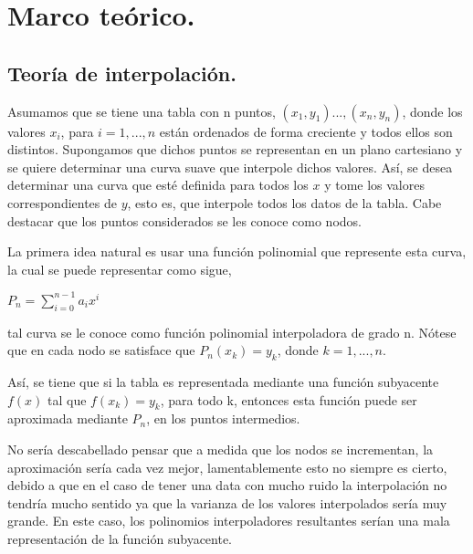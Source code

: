 \chapter{Marco te\'orico.}

\section{Teor\'ia de interpolaci\'on.}


\hspace{0.4cm}Asumamos que se tiene una tabla con n puntos, $(x_{1},y_{1})...,(x_{n},y_{n})$, donde los valores $x_{i}$, para $i=1,...,n$ est\'an ordenados de forma creciente y todos ellos son distintos. Supongamos que dichos puntos se representan en un plano cartesiano y se quiere determinar una curva suave que interpole dichos valores. As\'i, se desea determinar una curva que est\'e definida para todos los $x$ y tome los valores correspondientes de $y$, esto es, que interpole todos los datos de la tabla. Cabe destacar que los puntos considerados se les conoce como nodos.


\vspace{0.5cm}

\hspace{0.4cm} La primera idea natural es usar una funci\'on polinomial que represente esta curva, la cual se puede representar como sigue,

\vspace{0.5cm}
\begin{center}

$\displaystyle{P_{n} = \sum_{i=0}^{n-1} a_{i}x^{i}}$

\end{center}

\noindent tal curva se le conoce como funci\'on polinomial interpoladora de grado n. N\'otese que en cada nodo se satisface que $P_{n}(x_{k})=y_{k}$, donde $k=1,...,n$.

\vspace{0.5cm}

\hspace{0.4cm} As\'i, se tiene que si la tabla es representada mediante una funci\'on subyacente $f(x)$ tal que $f(x_{k})=y_{k}$, para todo k, entonces esta funci\'on puede ser aproximada mediante $P_{n}$, en los puntos intermedios.


\vspace{0.5cm}

\hspace{0.4cm} No ser\'ia descabellado pensar que a medida que los nodos se incrementan, la aproximaci\'on ser\'ia cada vez mejor, lamentablemente esto no siempre es cierto, debido a que en el caso de tener una data con mucho ruido la interpolaci\'on no tendr\'ia mucho sentido ya que la varianza de los valores interpolados ser\'ia muy grande. En este caso, los polinomios interpoladores resultantes ser\'ian una mala representaci\'on de la funci\'on subyacente.

